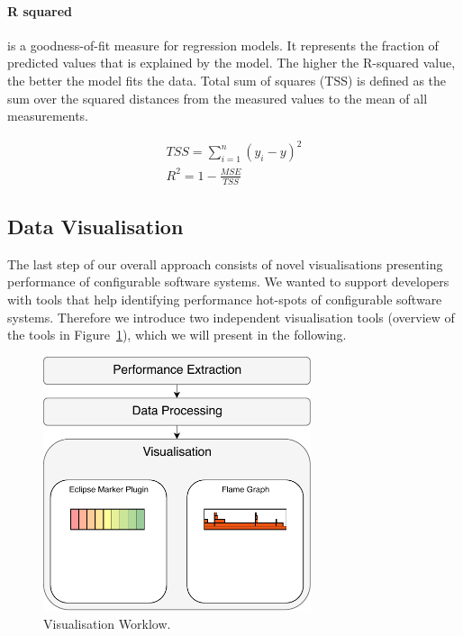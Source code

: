 \paragraph{R squared} 
is a goodness-of-fit measure for regression models. It represents the fraction of predicted values that is explained by the model. The higher the R-squared value, the better the model fits the data. Total sum of squares (TSS) is defined as the sum over the squared distances from the measured values to the mean of all measurements.

\begin{equation}
    \begin{aligned}
        \label{def:RSqu}
        TSS=\sum_{i=1}^n(y_i-y)^2
        \\
        R^2=1-\frac{MSE}{TSS}
    \end{aligned}
\end{equation}


\subsection{Data Visualisation}
\label{visualisation}

The last step of our overall approach consists of novel visualisations presenting performance of configurable software systems. We wanted to support developers with tools that help identifying performance hot-spots of configurable software systems. Therefore we introduce two independent visualisation tools (overview of the tools in Figure~\ref{data_vis_workflow}), which we will present in the following.

\begin{figure}[h]
  \centering
  \includegraphics[width=0.7\textwidth]{images/workflow_visual_expanded}
  \caption{Visualisation Worklow.}
  \label{data_vis_workflow}
\end{figure}


